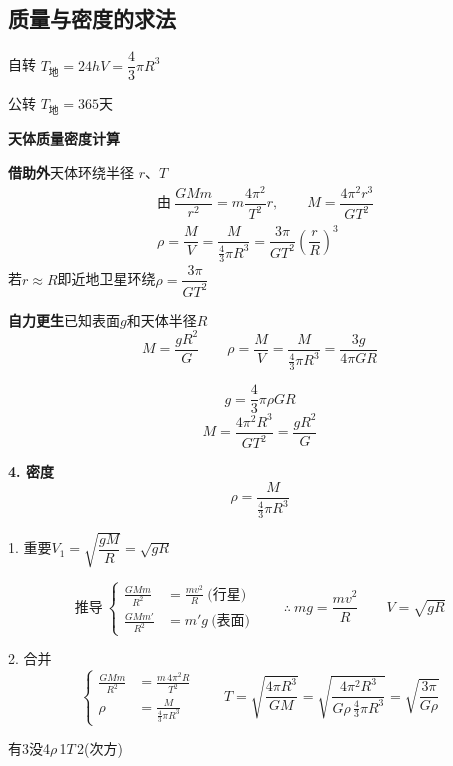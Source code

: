 \subsection{质量与密度的求法}
自转 $T_{\text{地}}=24\unit{h}$\quad $V=\dfrac{4}{3}\pi R^3$

公转 $T_{\text{地}}=365$天

\textbf{天体质量密度计算}

\textbf{借助外}\quad 天体环绕半径 $r$、$T$
\begin{align*}
& \text{由}\ \dfrac{GMm}{r^2}=m\dfrac{4\pi^2}{T^2}r, \qquad M=\dfrac{4\pi^2r^3}{GT^2}\\
& \rho=\dfrac{M}{V}=\dfrac{M}{\frac{4}{3}\pi R^3}=\dfrac{3\pi}{GT^2}\left(\dfrac{r}{R}\right)^3
\end{align*}
若$r\approx R$即近地卫星环绕\quad $\rho=\dfrac{3\pi}{GT^2}$

\textbf{自力更生}\quad 已知表面$g$和天体半径$R$
\[ M=\dfrac{gR^2}{G}\qquad \rho=\dfrac{M}{V}=\dfrac{M}{\frac{4}{3}\pi R^3}=\dfrac{3g}{4\pi GR} \]

\[ g=\dfrac{4}{3}\pi\rho GR \]
\[ M=\dfrac{4\pi^{2}R^{3}}{GT^{2}}=\dfrac{gR^{2}}{G} \]

\textbf{4. 密度}
\[ \rho=\frac{M}{\frac{4}{3}\pi R^{3}} \]

1. 重要\quad $V_1=\sqrt{\dfrac{gM}{R}}=\sqrt{gR}$ %

\[
\text{推导}\
\left\{\begin{aligned}
\frac{GMm}{R^{2}}&=\frac{mv^{2}}{R}\ \text{(行星)}\\
\frac{GMm'}{R^{2}}&=m'g\ \text{(表面)}
\end{aligned}\right.
\qquad \therefore\ mg=\frac{mv^{2}}{R}\qquad V=\sqrt{gR}
\]

2. 合并
\[
\left\{\begin{aligned}
\frac{GMm}{R^{2}}&=\frac{m\,4\pi^{2}R}{T^{2}}\\
\rho&=\frac{M}{\frac{4}{3}\pi R^{3}}
\end{aligned}\right.
\qquad
T=\sqrt{\frac{4\pi R^{3}}{GM}}=\sqrt{\frac{4\pi^{2}R^{3}}{G\rho\,\frac{4}{3}\pi R^{3}}}=\sqrt{\frac{3\pi}{G\rho}}
\] %

有3没4\quad $\rho$\,1\;$T$\,2\;(次方)

